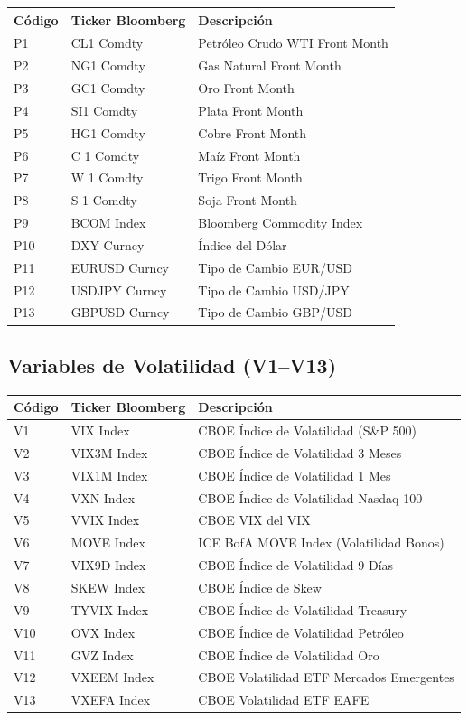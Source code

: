 \documentclass[11pt,a4paper]{article}
\begin{document}
\small
\begin{longtable}{lp{3.5cm}p{7.5cm}}
\toprule
\textbf{Código} & \textbf{Ticker Bloomberg} & \textbf{Descripción} \\
\midrule
\endhead
P1 & CL1 Comdty & Petróleo Crudo WTI Front Month \\
P2 & NG1 Comdty & Gas Natural Front Month \\
P3 & GC1 Comdty & Oro Front Month \\
P4 & SI1 Comdty & Plata Front Month \\
P5 & HG1 Comdty & Cobre Front Month \\
P6 & C 1 Comdty & Maíz Front Month \\
P7 & W 1 Comdty & Trigo Front Month \\
P8 & S 1 Comdty & Soja Front Month \\
P9 & BCOM Index & Bloomberg Commodity Index \\
P10 & DXY Curncy & Índice del Dólar \\
P11 & EURUSD Curncy & Tipo de Cambio EUR/USD \\
P12 & USDJPY Curncy & Tipo de Cambio USD/JPY \\
P13 & GBPUSD Curncy & Tipo de Cambio GBP/USD \\
\bottomrule
\end{longtable}
\normalsize

\subsection{Variables de Volatilidad (V1--V13)}

\small
\begin{longtable}{lp{3.5cm}p{7.5cm}}
\toprule
\textbf{Código} & \textbf{Ticker Bloomberg} & \textbf{Descripción} \\
\midrule
\endhead
V1 & VIX Index & CBOE Índice de Volatilidad (S\&P 500) \\
V2 & VIX3M Index & CBOE Índice de Volatilidad 3 Meses \\
V3 & VIX1M Index & CBOE Índice de Volatilidad 1 Mes \\
V4 & VXN Index & CBOE Índice de Volatilidad Nasdaq-100 \\
V5 & VVIX Index & CBOE VIX del VIX \\
V6 & MOVE Index & ICE BofA MOVE Index (Volatilidad Bonos) \\
V7 & VIX9D Index & CBOE Índice de Volatilidad 9 Días \\
V8 & SKEW Index & CBOE Índice de Skew \\
V9 & TYVIX Index & CBOE Índice de Volatilidad Treasury \\
V10 & OVX Index & CBOE Índice de Volatilidad Petróleo \\
V11 & GVZ Index & CBOE Índice de Volatilidad Oro \\
V12 & VXEEM Index & CBOE Volatilidad ETF Mercados Emergentes \\
V13 & VXEFA Index & CBOE Volatilidad ETF EAFE \\
\bottomrule
\end{longtable}
\normalsize
\end{document}

